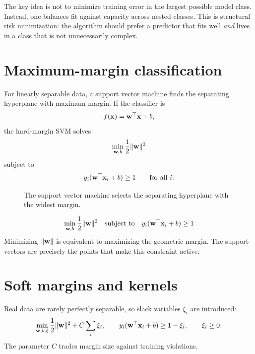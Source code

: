 The key idea is not to minimize training error in the largest possible model class. Instead, one balances fit against capacity across nested classes. This is structural risk minimization: the algorithm should prefer a predictor that fits well \emph{and} lives in a class that is not unnecessarily complex.

\section{Maximum-margin classification}

For linearly separable data, a support vector machine finds the separating hyperplane with maximum margin. If the classifier is
\[
  f(\mathbf{x}) = \mathbf{w}^\top \mathbf{x} + b,
\]
the hard-margin SVM solves
\[
  \min_{\mathbf{w},b} \frac{1}{2}\lVert \mathbf{w} \rVert^2
\]
subject to
\[
  y_i(\mathbf{w}^\top \mathbf{x}_i + b) \ge 1
  \qquad
  \text{for all } i.
\]

\begin{figure}[t]
\centering
{}
\caption{The support vector machine selects the separating hyperplane with the widest margin.}
\end{figure}

\begin{keyequation}
\[
\min_{\mathbf{w},b} \frac{1}{2}\lVert \mathbf{w} \rVert^2
\quad
\text{subject to}
\quad
y_i(\mathbf{w}^\top \mathbf{x}_i+b)\ge 1
\]
\tcblower
Minimizing $\lVert \mathbf{w} \rVert$ is equivalent to maximizing the geometric margin. The support vectors are precisely the points that make this constraint active.
\end{keyequation}

\section{Soft margins and kernels}

Real data are rarely perfectly separable, so slack variables $\xi_i$ are introduced:
\[
  \min_{\mathbf{w},b,\xi}
  \frac{1}{2}\lVert \mathbf{w} \rVert^2 + C \sum_i \xi_i,
  \qquad
  y_i(\mathbf{w}^\top \mathbf{x}_i+b) \ge 1-\xi_i,
  \qquad
  \xi_i \ge 0.
\]
The parameter $C$ trades margin size against training violations.

